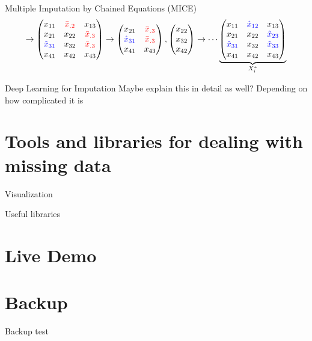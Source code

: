 \documentclass[aspectratio=43]{beamer}
\begin{document}
\begin{frame}{Multiple Imputation by Chained Equations (MICE)}
$$
\rightarrow
\begin{pmatrix}
x_{11} 		& \textcolor{red}{\bar{x}_{.2}} 	& x_{13} \\
x_{21} 		& x_{22} 		& \textcolor{red}{\bar{x}_{.3}} \\
\textcolor{blue}{\hat{x}_{31}} & x_{32} 	& \textcolor{red}{\bar{x}_{.3}} \\
x_{41} 		& x_{42} 	& x_{43} \\
\end{pmatrix}
\rightarrow
\begin{pmatrix}
x_{21} 		& \textcolor{red}{\bar{x}_{.3}} \\
\textcolor{blue}{\hat{x}_{31}} & \textcolor{red}{\bar{x}_{.3}} \\
x_{41} 		& x_{43} \\
\end{pmatrix},
\begin{pmatrix}
x_{22} \\
x_{32} \\
x_{42} \\
\end{pmatrix}
\rightarrow
\cdots
\underbrace{\begin{pmatrix}
x_{11} 		& \textcolor{blue}{\hat{x}_{12}} 	& x_{13} \\
x_{21} 		& x_{22} 		& \textcolor{blue}{\hat{x}_{23}} \\
\textcolor{blue}{\hat{x}_{31}} & x_{32} 	& \textcolor{blue}{\hat{x}_{33}} \\
x_{41} 		& x_{42} 	& x_{43} \\
\end{pmatrix}}_{X_i^{*}}
$$

\end{frame}

\begin{frame}{Deep Learning for Imputation}
Maybe explain this in detail as well? Depending on how complicated it is
\end{frame}


\section{Tools and libraries for dealing with missing data}

\begin{frame}{Visualization}
\end{frame}

\begin{frame}{Useful libraries}
\end{frame}

\section{Live Demo}

\appendix
\section{Backup}

\begin{frame}{Backup}
\scriptsize
test
\normalsize
\end{frame}
\end{document}
